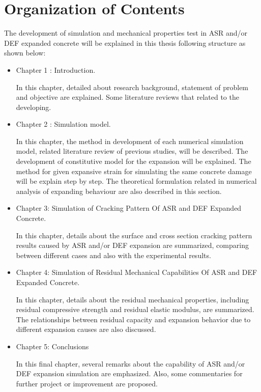 \section{Organization of Contents}

The development of simulation and mechanical properties test in ASR and/or DEF expanded concrete will be explained in this thesis following structure as shown below:

\begin{itemize}

    \item Chapter 1 : Introduction.

    In this chapter, detailed about research background, statement of problem and objective are explained. Some literature reviews that related to the developing.

    \item Chapter 2 : Simulation model.

    In this chapter, the method in development of each numerical simulation model, related literature review of previous studies, will be described. The development of constitutive model for the expansion will be explained. The method for given expansive strain for simulating the same concrete damage will be explain step by step. The theoretical formulation related in numerical analysis of expanding behaviour are also described in this section.

    \item Chapter 3: Simulation of Cracking Pattern Of ASR and DEF Expanded Concrete.

    In this chapter, details about the surface and cross section cracking pattern results caused by ASR and/or DEF expansion are summarized, comparing between different cases and also with the experimental results.

    \item Chapter 4: Simulation of Residual Mechanical Capabilities Of ASR and DEF Expanded Concrete.

    In this chapter, details about the residual mechanical properties, including residual compressive strength and residual elastic modulus, are summarized. The relationships between residual capacity and expansion behavior due to different expansion causes are also discussed.

    \item Chapter 5: Conclusions

    In this final chapter, several remarks about the capability of ASR and/or DEF expansion simulation are emphasized. Also, some commentaries for further project or improvement are proposed.


\end{itemize}
